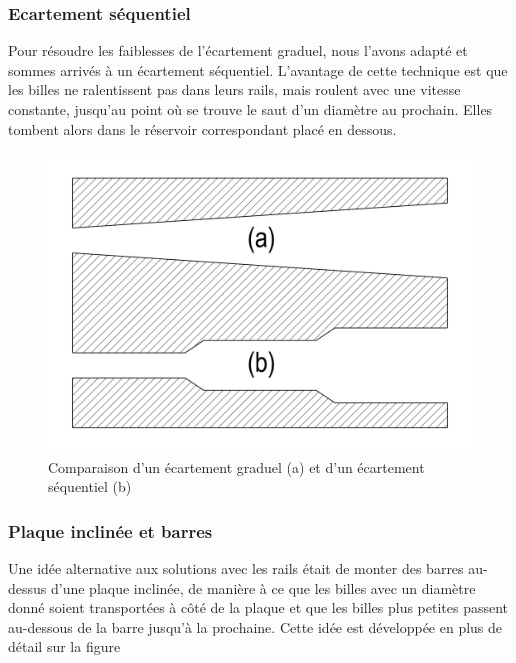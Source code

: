 \subsubsection{Ecartement séquentiel}
Pour résoudre les faiblesses de l'écartement graduel, nous l'avons adapté et sommes arrivés à un écartement séquentiel. L'avantage de cette technique est que les billes ne ralentissent pas dans leurs rails, mais roulent avec une vitesse constante, jusqu'au point où se trouve le saut d'un diamètre au prochain. Elles tombent alors dans le réservoir correspondant placé en dessous.

\begin{figure}
    \centering
    \includegraphics[width=\textwidth]{Graphics/Rails/ECARTEMENTS.pdf}
    \caption{Comparaison d'un écartement graduel (a) et d'un écartement séquentiel (b)}
\end{figure}

\subsubsection{Plaque inclinée et barres}
Une idée alternative aux solutions avec les rails était de monter des barres au-dessus d'une plaque inclinée, de manière à ce que les billes avec un diamètre donné soient transportées à côté de la plaque et que les billes plus petites passent au-dessous de la barre jusqu'à la prochaine. Cette idée est développée en plus de détail sur la figure %



